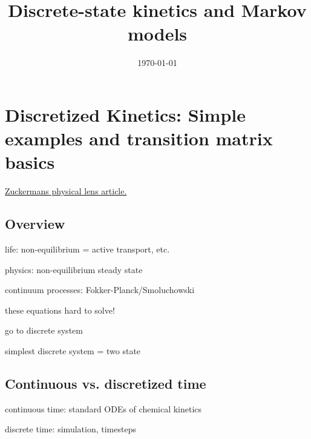 \documentclass[twocolumn]{notes}
\begin{document}
\title{Discrete-state kinetics and Markov models}
\date{\today} %
\maketitle
\tableofcontents
\newpage

\section{Discretized Kinetics: Simple examples and transition matrix basics}

\href{https://www.physicallensonthecell.org/discrete-state-kinetics-and-markov-models}{\color{darkred}Zuckermans physical lens article.}

\subsection{Overview}
\begin{itemizec}
    \item life: non-equilibrium = active transport, etc.
    \item physics: non-equilibrium steady state
    \item continuum processes: Fokker-Planck/Smoluchowski
    \item these equations hard to solve!
    \item go to discrete system
    \item simplest discrete system = two state
\end{itemizec}
\subsection{Continuous vs. discretized time}
\begin{itemizec}
    \item continuous time: standard ODEs of chemical kinetics
    \item discrete time: simulation, timesteps
\end{itemizec}
\end{document}
